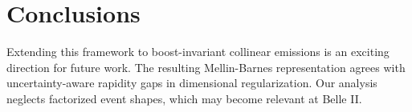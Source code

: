 \section{Conclusions}\label{sec:conclusions}

Extending this framework to boost-invariant collinear emissions is an
exciting direction for future work. The resulting Mellin-Barnes
representation agrees with uncertainty-aware rapidity gaps in
dimensional regularization. Our analysis neglects factorized event
shapes, which may become relevant at Belle II.

